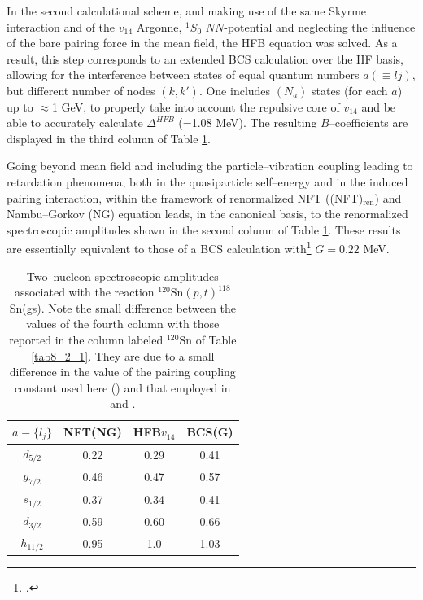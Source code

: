 In the second calculational scheme, and making use of the same Skyrme interaction and of the $v_{14}$ Argonne, $^1S_0$ $NN$-potential and neglecting the influence of the bare
pairing force in the mean field,
the HFB equation was solved. As a result, this step corresponds to an extended BCS calculation over the HF basis, allowing for the 
interference between states of equal quantum numbers $a (\equiv lj)$, but different number of nodes $(k,k')$. One includes $(N_a)$ states
(for each $a$) up to $\approx $1 GeV, to properly take into account  the repulsive core of $v_{14}$ and be able to accurately calculate 
$\Delta^{HFB}$ (=1.08 MeV). The resulting $B$--coefficients are displayed in the third column of Table \ref{tab6.4.3}.


 Going beyond mean field and including the particle--vibration coupling leading to retardation phenomena, both in the quasiparticle self--energy and in the  induced pairing interaction, within the framework of renormalized NFT ((NFT)$_{\text{ren}}$) and Nambu--Gorkov (NG) equation leads, in the canonical basis, to the renormalized spectroscopic amplitudes shown in the second column of Table \ref{tab6.4.3}. These results are essentially equivalent to those of a BCS calculation with\footnote{\cite{Idini:15}.} $G=0.22$ MeV. 

\begin{table}
\begin{center}
\begin{tabular}{|c|c|c|c|}
\hline
$a\equiv\{l_j\}$ & NFT(NG)  & HFB$v_{14}$  & BCS(G)  \\ 
 \hline 
$d_{5/2}$ & 0.22 & 0.29 & 0.41 \\ 
\hline 
$g_{7/2}$ & 0.46 & 0.47 &  0.57\\ 
 \hline
$s_{1/2}$ & 0.37 & 0.34 & 0.41 \\ 
 \hline
$d_{3/2}$ & 0.59 & 0.60 & 0.66 \\ 
 \hline
$h_{11/2}$ & 0.95 & 1.0 & 1.03\\
 \hline
\end{tabular}
\end{center}
\caption{Two--nucleon spectroscopic amplitudes associated with the reaction $^{120}$Sn$(p,t)^{118}$Sn(gs). Note the small difference between the values of the fourth column with those reported in the column labeled $^{120}$Sn of Table \ref{tab8_2_1}. They are due to a small difference in the value of the pairing coupling constant used here  (\cite{Potel:17}) and that employed in \cite{Potel:17} and \cite{Potel:13b}.}\label{tab6.4.3}
\end{table} 

